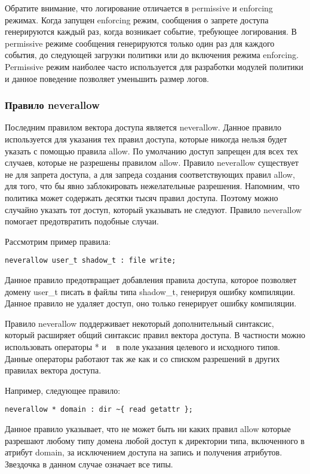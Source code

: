 \documentclass{./../class/UIR}
\begin{document}
    Обратите внимание, что логирование отличается в permissive и enforcing
    режимах. Когда запущен enforcing режим, сообщения о запрете доступа
    генерируются каждый раз, когда возникает событие, требующее логирования. В
    permissive режиме сообщения генерируются только один раз для каждого
    события, до следующей загрузки политики или до включения режима enforcing.
    Permissive режим наиболее часто используется для разработки модулей
    политики и данное поведение позволяет уменьшить размер логов.

\subsubsection{Правило neverallow}

    Последним правилом вектора доступа является neverallow. Данное правило
    используется для указания тех правил доступа, которые никогда нельзя будет
    указать с помощью правила allow. По умолчанию доступ запрещен для всех тех
    случаев, которые не разрешены правилом allow. Правило neverallow существует
    не для запрета доступа, а для запреда создания соответствующих правил allow,
    для того, что бы явно заблокировать нежелательные разрешения. Напомним, что
    политика может содержать десятки тысяч правил доступа. Поэтому можно
    случайно указать тот доступ, который указывать не следуют. Правило
    neverallow помогает предотвратить подобные случаи.

    Рассмотрим пример правила:
\begin{verbatim}
neverallow user_t shadow_t : file write;
\end{verbatim}
    Данное правило предотвращает добавления правила доступа, которое позволяет
    домену user\_t писать в файлы типа shadow\_t, генерируя ошибку компиляции.
    Данное правило не удаляет доступ, оно только генерирует ошибку компиляции.

    Правило neverallow поддерживает некоторый дополнительный синтаксис, который
    расширяет общий синтаксис правил вектора доступа. В частности можно
    использовать операторы * и ~ в поле указания целевого и исходного типов.
    Данные операторы работают так же как и со списком разрешений в других
    правилах вектора доступа.

    Например, следующее правило:
\begin{verbatim}
neverallow * domain : dir ~{ read getattr };
\end{verbatim}
    Данное правило указывает, что не может быть ни каких правил allow которые
    разрешают любому типу домена любой доступ к директории типа, включенного в
    атрибут domain, за исключением доступа на запись и получения атрибутов.
    Звездочка в данном случае означает все типы.
\end{document}
